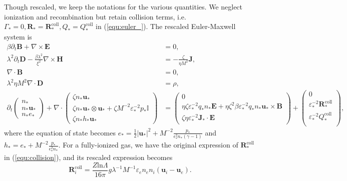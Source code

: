 \documentclass{article}
\begin{document}
Though rescaled, we keep the notations for the various quantities. We neglect ionization and recombination but retain collision terms,
i.e. $\Gamma_* = 0, \mathbf{R}_* = \mathbf{R}_*^\text{coll}, Q_* = Q_*^\text{coll}$ in
(\ref{equ:euler_}). The rescaled Euler-Maxwell system is
\begin{subequations}
\begin{align}
  \beta \partial_t \mathbf{B} + \nabla \times \mathbf{E} &= 0, \label{equ:maxwell_faraday_rescalling} \\ 
  \lambda^2 \partial_t \mathbf{D} - \frac{\beta \lambda^2}{\xi^2}\nabla \times \mathbf{H} &= - \frac{\zeta}{\eta M^2}\mathbf{J}, \label{equ:maxwell_ampere_rescalling} \\
  \nabla \cdot \mathbf{B} &= 0,  \label{equ:maxwell_gauss_B_rescalling}\\
  \lambda^2 \eta M^2 \nabla \cdot \mathbf{D} &= \rho, \label{equ:maxwell_gauss_D_rescalling} \\
  \partial_t
    \begin{pmatrix}
    n_* \\
    n_* \mathbf{u}_* \\
    n_* e_*
    \end{pmatrix}
    + \nabla \cdot
    \begin{pmatrix}
    \zeta n_* \mathbf{u}_* \\
    \zeta n_* \mathbf{u}_* \otimes \mathbf{u}_* + \zeta M^{-2} \varepsilon_*^{-2} p_*\mathbb{I} \\
    \zeta n_* h_* \mathbf{u}_*
    \end{pmatrix}
    &=
    \begin{pmatrix}
    0 \\
    \eta \zeta \varepsilon_*^{-2} q_* n_*\mathbf{E} + \eta \zeta^2 \beta \varepsilon_*^{-2} q_* n_* \mathbf{u}_* \times \mathbf{B} \\
    \zeta \eta \varepsilon_*^{-2} \mathbf{J}_* \cdot \mathbf{E}
    \end{pmatrix} +
    \begin{pmatrix}
    0 \\
    \varepsilon_*^{-2}\mathbf{R}_*^{\text{coll}} \\
    \varepsilon_*^{-2}Q_*^{\text{coll}} \\
    \end{pmatrix}, \label{equ:euler_rescalling}
\end{align}
\end{subequations}
where the equation of state becomes
$e_* = \frac{1}{2}|\mathbf{u_*}|^2 + M^{-2}\frac{p_*}{\epsilon^2_* n_* (\gamma - 1)}$ and
$h_* = e_* + M^{-2}\frac{p_*}{\epsilon^2_* n_*}$. For a fully-ionized gas, we have the
original expression of $\mathbf{R}_*^{\text{coll}}$ in (\ref{equ:collision}), and its
rescaled expression becomes
\begin{equation}
    \mathbf{R}_i^{\text{coll}} = \frac{Z\text{ln}\Lambda}{16\pi}g\lambda^{-1}M^{-1}\varepsilon_en_en_i(\mathbf{u}_i - \mathbf{u}_e). \label{equ:rescaling_friction}
\end{equation}
\end{document}
